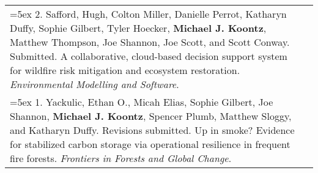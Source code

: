 \begin{longtable}{@{} >{\raggedright}p{6.10in} >{\raggedleft}X @{}}

\hangindent=5ex 2. Safford, Hugh, Colton Miller, Danielle Perrot, Katharyn Duffy, Sophie Gilbert, Tyler Hoecker, \textbf{Michael J. Koontz}, Matthew Thompson, Joe Shannon, Joe Scott, and Scott Conway. Submitted. A collaborative, cloud-based decision support system for wildfire risk mitigation and ecosystem restoration. \emph{Environmental Modelling and Software}. & \tabularnewline

\hangindent=5ex 1. Yackulic, Ethan O., Micah Elias, Sophie Gilbert, Joe Shannon, \textbf{Michael J. Koontz}, Spencer Plumb, Matthew Sloggy, and Katharyn Duffy. Revisions submitted. Up in smoke? Evidence for stabilized carbon storage via operational resilience in frequent fire forests. \emph{Frontiers in Forests and Global Change}. & \tabularnewline


\end{longtable}
